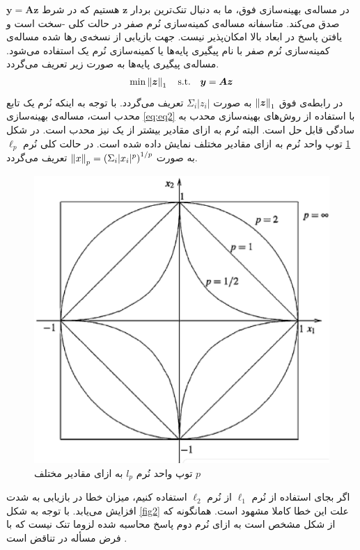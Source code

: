 در مساله‌ی بهینه‌سازی فوق، ما به دنبال تنک‌ترین بردار 
$\bm{z}$
هستیم که در شرط 
$\bm{y}= \bm{A}\bm{z}$
صدق می‌کند. متاسفانه مساله‌ی کمینه‌سازی نُرم صفر در حالت کلی 
 -سخت
 است و یافتن پاسخ در ابعاد بالا امکان‌پذیر نیست. جهت بازیابی از نسخه‌ی رها شده 
 مساله‌ی کمینه‌سازی نُرم صفر با نام پیگیری پایه‌ها
 یا کمینه‌سازی نُرم یک استفاده می‌شود. مساله‌ی پیگیری پایه‌ها به صورت زیر تعریف می‌گردد.
\begin{align}
\label{eq:eq3}
\min \left\lVert\bm{z}\right\rVert_{1} \quad \text{s.t.}\quad \bm{y}= \bm{A}\bm{z}
\end{align}
در رابطه‌ی فوق
$\left\lVert\bm{z}\right\rVert_{1}$
به صورت 
$\Sigma_{i} |z_{i}|$
تعریف می‌گردد. با توجه به اینکه نُرم 
یک تابع محدب است، مساله‌ی بهینه‌سازی 
\eqref{eq:eq2}
با استفاده از روش‌های بهینه‌سازی محدب به سادگی قابل حل است. البته نُرم به ازای مقادیر بیشتر از یک نیز محدب است. در شکل
\ref{fig1}
توپ واحد نُرم به ازای مقادیر مختلف نمایش داده شده است. در حالت کلی نُرم
$\ell_{p}$
به صورت
$\left\lVert x\right\rVert_{p}= \left(\Sigma_{i} |x_{i}|^{p} \right)^{1/p}$
تعریف می‌گردد.
\begin{figure}[t]
\centering
\includegraphics[scale=0.3]{Images/ch1/fig1.eps}
\caption{توپ واحد نُرم $l_{p}$ به ازای مقادیر مختلف $p$}
\label{fig1}
\end{figure}

اگر بجای استفاده از نُرم 
$\ell_{1}$
از نُرم
$\ell_{2}$
 استفاده کنیم، میزان خطا در بازیابی به شدت افزایش می‌یابد. با توجه به شکل
\ref{fig2}
علت این خطا کاملا مشهود است. همانگونه که از شکل مشخص است به ازای نُرم دوم پاسخ محاسبه شده لزوما تنک نیست که با فرض مسأله در تناقض است
\cite{boche2015compressed}.

